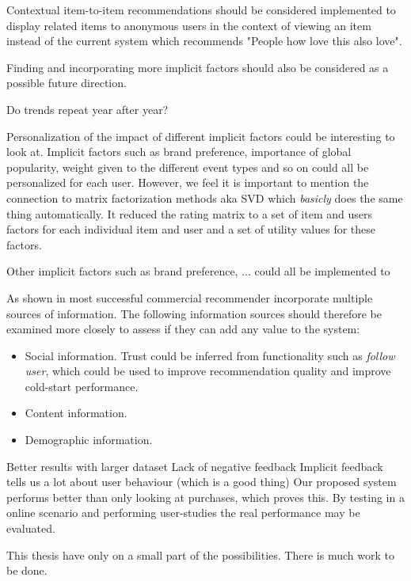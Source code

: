 
Contextual item-to-item recommendations should be considered implemented to
display related items to anonymous users in the context of viewing an item
instead of the current system which recommends "People how love this also
love".

Finding and incorporating more implicit factors should also be considered as a
possible future direction.

Do trends repeat year after year?

Personalization of the impact of different implicit factors could be
interesting to look at.  Implicit factors such as brand preference, importance
of global popularity, weight given to the different event types and so on could
all be personalized for each user.  However, we feel it is important to mention
the connection to matrix factorization methods aka SVD which \emph{basicly}
does the same thing automatically. It reduced the rating matrix to a set of
item and users factors for each individual item and user and a set of utility
values for these factors.


Other implicit factors such as brand preference, ... could all be implemented
to

As shown in \cite{FranceTelecom} most successful commercial recommender
incorporate multiple sources of information. The following information sources
should therefore be examined more closely to assess if they can add any value
to the system:

\begin{itemize}
\item Social information. Trust could be inferred from functionality such as
\emph{follow user}, which could be used to improve recommendation quality and
improve cold-start performance.
\item Content information.
\item Demographic information.
\end{itemize}




Better results with larger dataset
Lack of negative feedback
Implicit feedback tells us a lot about user behaviour (which is a good thing)
Our proposed system performs better than only looking at purchases, which
proves this.
By testing in a online scenario and performing user-studies the real
performance may be evaluated.

This thesis have only on a small part of the possibilities. There is much work
to be done. %
